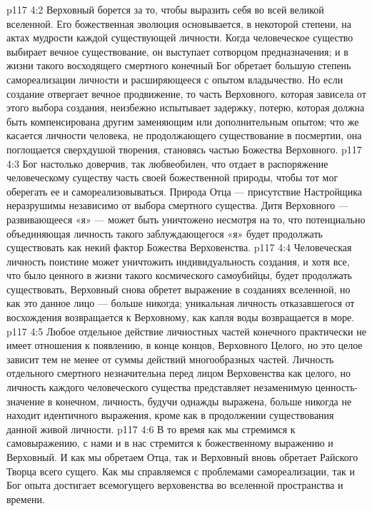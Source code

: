 \vs p117 4:2 Верховный борется за то, чтобы выразить себя во всей великой вселенной. Его божественная эволюция основывается, в некоторой степени, на актах мудрости каждой существующей личности. Когда человеческое существо выбирает вечное существование, он выступает сотворцом предназначения; и в жизни такого восходящего смертного конечный Бог обретает большую степень самореализации личности и расширяющееся с опытом владычество. Но если создание отвергает вечное продвижение, то часть Верховного, которая зависела от этого выбора создания, неизбежно испытывает задержку, потерю, которая должна быть компенсирована другим заменяющим или дополнительным опытом; что же касается личности человека, не продолжающего существование в посмертии, она поглощается сверхдушой творения, становясь частью Божества Верховного.
\vs p117 4:3 Бог настолько доверчив, так любвеобилен, что отдает в распоряжение человеческому существу часть своей божественной природы, чтобы тот мог оберегать ее и самореализовываться. Природа Отца --- присутствие Настройщика неразрушимы независимо от выбора смертного существа. Дитя Верховного --- развивающееся «я» --- может быть уничтожено несмотря на то, что потенциально объединяющая личность такого заблуждающегося «я» будет продолжать существовать как некий фактор Божества Верховенства.
\vs p117 4:4 Человеческая личность поистине может уничтожить индивидуальность создания, и хотя все, что было ценного в жизни такого космического самоубийцы, будет продолжать существовать,  Верховный снова обретет выражение в созданиях вселенной, но как это данное лицо --- больше никогда; уникальная личность отказавшегося от восхождения возвращается к Верховному, как капля воды возвращается в море.
\vs p117 4:5 Любое отдельное действие личностных частей конечного практически не имеет отношения к появлению, в конце концов, Верховного Целого, но это целое зависит тем не менее от суммы действий многообразных частей. Личность отдельного смертного незначительна перед лицом Верховенства как целого, но личность каждого человеческого существа представляет незаменимую ценность\hyp{}значение в конечном, личность, будучи однажды выражена, больше никогда не находит идентичного выражения, кроме как в продолжении существования данной живой личности.
\vs p117 4:6 В то время как мы стремимся к самовыражению, с нами и в нас стремится к божественному выражению и Верховный. И как мы обретаем Отца, так и Верховный вновь обретает Райского Творца всего сущего. Как мы справляемся с проблемами самореализации, так и Бог опыта достигает всемогущего верховенства во вселенной пространства и времени.
